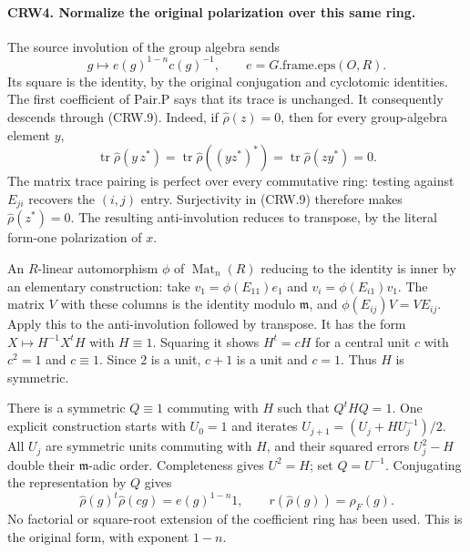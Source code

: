 \paragraph{CRW4. Normalize the original polarization over this same ring.}
\label{claim:CRW4}
The source involution of the group algebra sends
\[
 g\longmapsto e(g)^{1-n}c(g)^{-1},
 \qquad e=G.\mathrm{frame.eps}(O,R).
\]
Its square is the identity, by the original conjugation and
cyclotomic identities.  The first coefficient of $\mathrm{Pair.P}$
says that its trace is unchanged.  It consequently descends
through (CRW.9).  Indeed, if $\widehat\rho(z)=0$, then for every
group-algebra element $y$,
\[
 \operatorname{tr}\widehat\rho(y\,z^*)
 =\operatorname{tr}\widehat\rho((y z^*)^*)
 =\operatorname{tr}\widehat\rho(z y^*)=0.
\]
The matrix trace pairing is perfect over every commutative ring:
testing against $E_{ji}$ recovers the $(i,j)$ entry.  Surjectivity
in (CRW.9) therefore makes $\widehat\rho(z^*)=0$.
The resulting anti-involution reduces to transpose, by the
literal form-one polarization of $x$.

An $R$-linear automorphism $\phi$ of $\operatorname{Mat}_n(R)$
reducing to the identity is inner by an elementary construction:
take $v_1=\phi(E_{11})e_1$ and $v_i=\phi(E_{i1})v_1$.
The matrix $V$ with these columns is the identity modulo
$\mathfrak m$, and $\phi(E_{ij})V=VE_{ij}$.
Apply this to the anti-involution followed by transpose.
It has the form $X\mapsto H^{-1}X^tH$ with $H\equiv1$.
Squaring it shows $H^t=cH$ for a central unit $c$ with
$c^2=1$ and $c\equiv1$.  Since $2$ is a unit, $c+1$ is a unit
and $c=1$.  Thus $H$ is symmetric.

There is a symmetric $Q\equiv1$ commuting with $H$ such that
$Q^tHQ=1$.  One explicit construction starts with $U_0=1$ and
iterates $U_{j+1}=(U_j+H U_j^{-1})/2$.
All $U_j$ are symmetric units commuting with $H$, and their
squared errors $U_j^2-H$ double their $\mathfrak m$-adic order.
Completeness gives $U^2=H$; set $Q=U^{-1}$.
Conjugating the representation by $Q$ gives
\[
 \widehat\rho(g)^t\widehat\rho(cg)=e(g)^{1-n}1,
 \qquad r(\widehat\rho(g))=\rho_F(g).                \tag{CRW.10}
\]
No factorial or square-root extension of the coefficient ring
has been used.  This is the original form, with exponent $1-n$.

